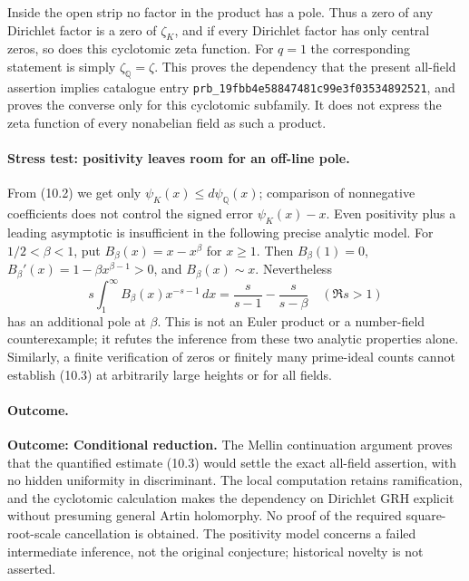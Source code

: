 \documentclass[11pt,a4paper]{article}
\newcommand{\Q}{\mathbb{Q}}
\begin{document}
Inside the open strip no factor in the product has a pole. Thus a zero
of any Dirichlet factor is a zero of $\zeta_K$, and if every Dirichlet
factor has only central zeros, so does this cyclotomic zeta function.
For $q=1$ the corresponding statement is simply $\zeta_{\Q}=\zeta$.
This proves the dependency that the present all-field assertion implies
catalogue entry \texttt{prb\_19fbb4e58847481c99e3f03534892521}, and proves the converse only for this cyclotomic subfamily.
It does not express the zeta function of every nonabelian field as
such a product.

\paragraph{Stress test: positivity leaves room for an off-line pole.}
From (10.2) we get only $\psi_K(x)\leq d\psi_{\Q}(x)$; comparison of
nonnegative coefficients does not control the signed error
$\psi_K(x)-x$. Even positivity plus a leading asymptotic is insufficient
in the following precise analytic model. For $1/2<\beta<1$, put
$B_\beta(x)=x-x^\beta$ for $x\geq1$. Then
$B_\beta(1)=0$, $B_\beta'(x)=1-\beta x^{\beta-1}>0$,
and $B_\beta(x)\sim x$. Nevertheless
\[
 s\int_1^\infty B_\beta(x)x^{-s-1}\,dx
       =\frac{s}{s-1}-\frac{s}{s-\beta}\quad(\Re s>1)
\]
has an additional pole at $\beta$. This is not an Euler product or a
number-field counterexample; it refutes the inference from these two
analytic properties alone. Similarly, a finite verification of zeros
or finitely many prime-ideal counts cannot establish (10.3) at arbitrarily
large heights or for all fields.

\paragraph{Outcome.}
\textbf{Outcome: Conditional reduction.}
The Mellin continuation argument proves that the quantified estimate
(10.3) would settle the exact all-field assertion, with no hidden
uniformity in discriminant. The local computation retains ramification,
and the cyclotomic calculation makes the dependency on Dirichlet GRH
explicit without presuming general Artin holomorphy. No proof of the
required square-root-scale cancellation is obtained. The positivity
model concerns a failed intermediate inference, not the original
conjecture; historical novelty is not asserted.
\end{document}
